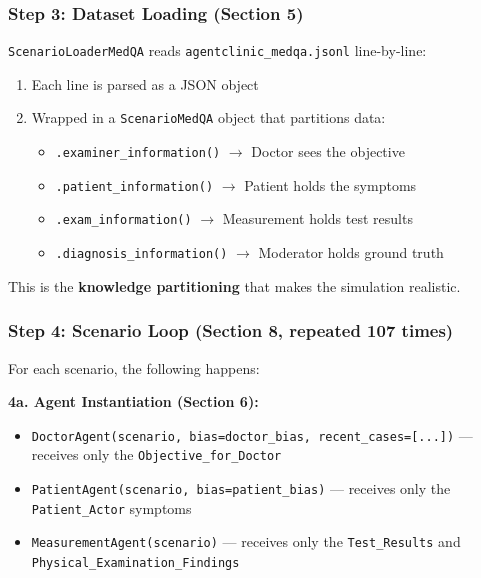 \subsubsection{Step 3: Dataset Loading (Section 5)}

\begin{acadbox}[\textcolor{white}{What Happens}]
\texttt{ScenarioLoaderMedQA} reads \texttt{agentclinic\_medqa.jsonl} line-by-line:
\begin{enumerate}
    \item Each line is parsed as a JSON object
    \item Wrapped in a \texttt{ScenarioMedQA} object that partitions data:
    \begin{itemize}
        \item \texttt{.examiner\_information()} $\rightarrow$ Doctor sees the objective
        \item \texttt{.patient\_information()} $\rightarrow$ Patient holds the symptoms
        \item \texttt{.exam\_information()} $\rightarrow$ Measurement holds test results
        \item \texttt{.diagnosis\_information()} $\rightarrow$ Moderator holds ground truth
    \end{itemize}
\end{enumerate}
This is the \textbf{knowledge partitioning} that makes the simulation realistic.
\end{acadbox}

\subsubsection{Step 4: Scenario Loop (Section 8, repeated 107 times)}

For each scenario, the following happens:

\textbf{4a. Agent Instantiation (Section 6):}
\begin{itemize}
    \item \texttt{DoctorAgent(scenario, bias=doctor\_bias, recent\_cases=[...])} --- receives only the \texttt{Objective\_for\_Doctor}
    \item \texttt{PatientAgent(scenario, bias=patient\_bias)} --- receives only the \texttt{Patient\_Actor} symptoms
    \item \texttt{MeasurementAgent(scenario)} --- receives only the \texttt{Test\_Results} and \texttt{Physical\_Examination\_Findings}
\end{itemize}

